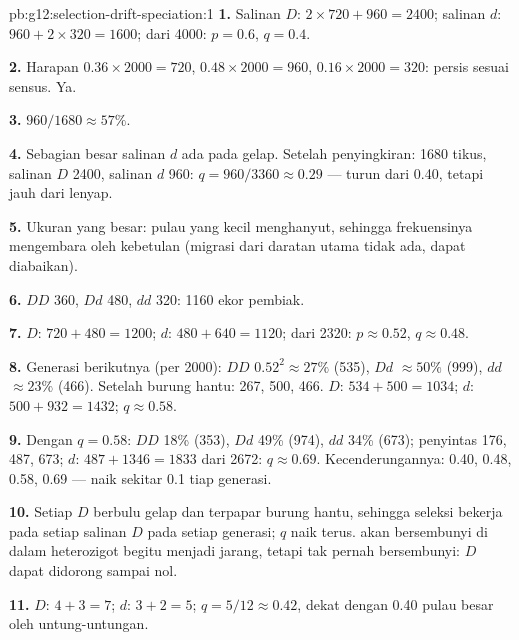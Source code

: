 \begin{solution}{pb:g12:selection-drift-speciation:1}
\textbf{1.} Salinan $D$: $2 \times 720 + 960 = 2400$; salinan $d$: $960 +
2 \times 320 = 1600$; dari 4000: $p = 0.6$, $q = 0.4$.

\textbf{2.} Harapan $0.36 \times 2000 = 720$, $0.48 \times 2000 =
960$, $0.16 \times 2000 = 320$: persis sesuai sensus. Ya.

\textbf{3.} $960/1680 \approx 57\%$.

\textbf{4.} Sebagian besar salinan $d$ ada pada  gelap. Setelah
penyingkiran: 1680 tikus, salinan $D$ 2400, salinan $d$ 960: $q = 960/3360 \approx
0.29$ --- turun dari 0.40, tetapi jauh dari lenyap.

\textbf{5.} Ukuran yang besar:  pulau yang kecil menghanyut,
sehingga frekuensinya mengembara oleh kebetulan (migrasi dari daratan
utama tidak ada,  dapat diabaikan).

\textbf{6.} $DD$ 360, $Dd$ 480, $dd$ 320: 1160 ekor pembiak.

\textbf{7.} $D$: $720 + 480 = 1200$; $d$: $480 + 640 = 1120$; dari 2320:
$p \approx 0.52$, $q \approx 0.48$.

\textbf{8.} Generasi berikutnya (per 2000): $DD$ $0.52^2 \approx 27\%$
(535), $Dd$ $\approx 50\%$ (999), $dd$ $\approx 23\%$ (466). Setelah
burung hantu: 267, 500, 466. $D$: $534 + 500 = 1034$; $d$: $500 + 932 =
1432$; $q \approx 0.58$.

\textbf{9.} Dengan $q = 0.58$: $DD$ 18\% (353), $Dd$ 49\% (974), $dd$
34\% (673); penyintas 176, 487, 673; $d$: $487 + 1346 = 1833$ dari 2672:
$q \approx 0.69$. Kecenderungannya: 0.40, 0.48, 0.58, 0.69 --- naik sekitar
0.1 tiap generasi.

\textbf{10.} Setiap  $D$ berbulu gelap dan terpapar burung
hantu, sehingga seleksi bekerja pada setiap salinan $D$ pada setiap
generasi; $q$ naik terus.   akan bersembunyi di dalam
heterozigot begitu menjadi jarang, tetapi   tak pernah
bersembunyi: $D$ dapat didorong sampai nol.

\textbf{11.} $D$: $4 + 3 = 7$; $d$: $3 + 2 = 5$; $q = 5/12 \approx
0.42$, dekat dengan 0.40 pulau besar oleh untung-untungan.


\end{solution}
